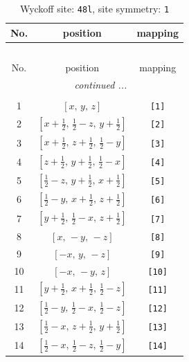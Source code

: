 \documentclass[fleqn,8pt]{jsarticle}
\begin{document}
\begin{longtable}{ccc}
\caption{Wyckoff site: {\tt 48l}, site symmetry: {\tt 1}}
 \\
 \hline \hline
No. & position & mapping \\ \hline \endfirsthead

\multicolumn{2}{l}{\tablename\ \thetable{}} \\
 \hline \hline
No. & position & mapping \\ \hline \endhead

 \hline \hline
\multicolumn{2}{r}{\footnotesize\it continued ...} \\ \endfoot

 \hline \hline
\multicolumn{2}{r}{} \\ \endlastfoot

1 & $\left[ x,\, y,\, z \right]$ & {\tt [1]} \\ \hline
2 & $\left[ x + \frac{1}{2},\, \frac{1}{2} - z,\, y + \frac{1}{2} \right]$ & {\tt [2]} \\ \hline
3 & $\left[ x + \frac{1}{2},\, z + \frac{1}{2},\, \frac{1}{2} - y \right]$ & {\tt [3]} \\ \hline
4 & $\left[ z + \frac{1}{2},\, y + \frac{1}{2},\, \frac{1}{2} - x \right]$ & {\tt [4]} \\ \hline
5 & $\left[ \frac{1}{2} - z,\, y + \frac{1}{2},\, x + \frac{1}{2} \right]$ & {\tt [5]} \\ \hline
6 & $\left[ \frac{1}{2} - y,\, x + \frac{1}{2},\, z + \frac{1}{2} \right]$ & {\tt [6]} \\ \hline
7 & $\left[ y + \frac{1}{2},\, \frac{1}{2} - x,\, z + \frac{1}{2} \right]$ & {\tt [7]} \\ \hline
8 & $\left[ x,\, - y,\, - z \right]$ & {\tt [8]} \\ \hline
9 & $\left[ - x,\, y,\, - z \right]$ & {\tt [9]} \\ \hline
10 & $\left[ - x,\, - y,\, z \right]$ & {\tt [10]} \\ \hline
11 & $\left[ y + \frac{1}{2},\, x + \frac{1}{2},\, \frac{1}{2} - z \right]$ & {\tt [11]} \\ \hline
12 & $\left[ \frac{1}{2} - y,\, \frac{1}{2} - x,\, \frac{1}{2} - z \right]$ & {\tt [12]} \\ \hline
13 & $\left[ \frac{1}{2} - x,\, z + \frac{1}{2},\, y + \frac{1}{2} \right]$ & {\tt [13]} \\ \hline
14 & $\left[ \frac{1}{2} - x,\, \frac{1}{2} - z,\, \frac{1}{2} - y \right]$ & {\tt [14]} \\ \hline

\end{longtable}
\end{document}
